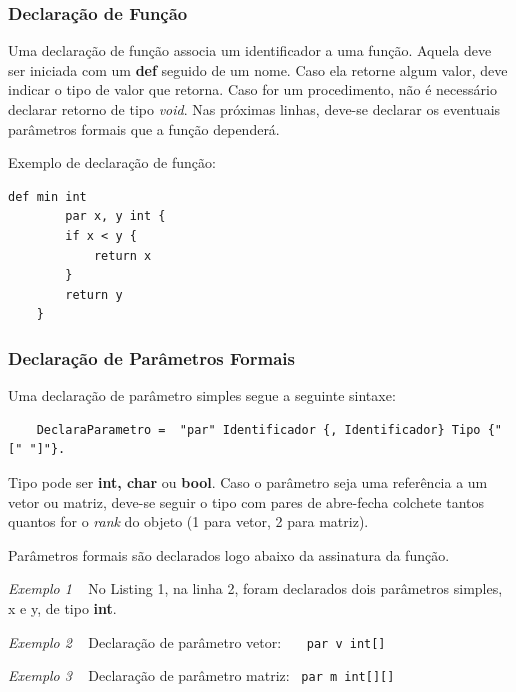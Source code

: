 \documentclass[a4paper,12pt]{report}
\begin{document}
    \subsubsection*{Declaração de Função}
    Uma declaração de função associa um identificador a uma função. Aquela deve ser iniciada com um \textbf{def} seguido de um nome. Caso ela retorne algum valor, deve indicar o tipo de valor que retorna. Caso for um procedimento, não é necessário declarar retorno de tipo \textit{void}. Nas próximas linhas, deve-se declarar os eventuais parâmetros formais que a função dependerá.

    Exemplo de declaração de função:

    \begin{lstlisting}[caption={Declaração de função}]
    def min int
        par x, y int {
        if x < y {
            return x
        }
        return y
    }
    \end{lstlisting}

    \subsubsection*{Declaração de Parâmetros Formais}
    Uma declaração de parâmetro simples segue a seguinte sintaxe:

    \begin{verbatim}
    DeclaraParametro =  "par" Identificador {, Identificador} Tipo {"[" "]"}. \end{verbatim}
    Tipo pode ser \textbf{int, char} ou \textbf{bool}. Caso o parâmetro seja uma referência a um vetor ou matriz, deve-se seguir o tipo com pares de abre-fecha colchete tantos quantos for o \textit{rank} do objeto (1 para vetor, 2 para matriz).

    Parâmetros formais são declarados logo abaixo da assinatura da função.
    
    \textit{Exemplo 1} ~
     No Listing 1, na linha 2, foram declarados dois parâmetros simples, x e y, de tipo \textbf{int}.

    \textit{Exemplo 2} ~
     Declaração de parâmetro vetor: ~~~\verb|par v int[]|
    
    \textit{Exemplo 3} ~
     Declaração de parâmetro matriz: ~\verb|par m int[][]|
\end{document}
